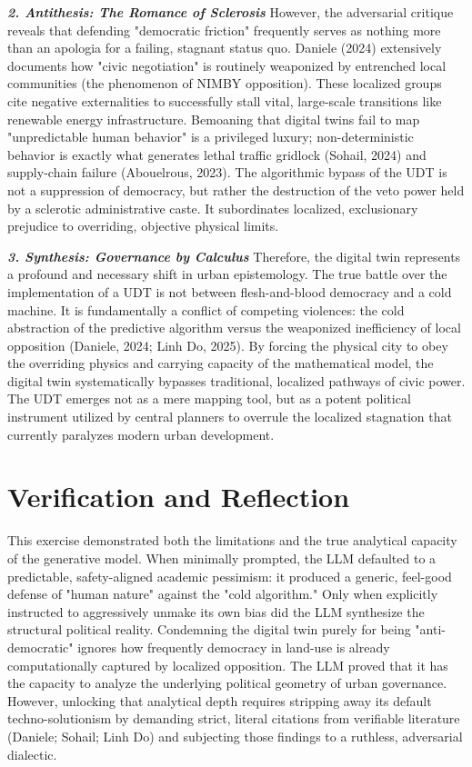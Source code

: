 \documentclass[11pt, twocolumn]{article}
\begin{document}
\textbf{\textit{2. Antithesis: The Romance of Sclerosis}}
However, the adversarial critique reveals that defending "democratic friction" frequently serves as nothing more than an apologia for a failing, stagnant status quo. Daniele (2024) extensively documents how "civic negotiation" is routinely weaponized by entrenched local communities (the phenomenon of NIMBY opposition). These localized groups cite negative externalities to successfully stall vital, large-scale transitions like renewable energy infrastructure. Bemoaning that digital twins fail to map "unpredictable human behavior" is a privileged luxury; non-deterministic behavior is exactly what generates lethal traffic gridlock (Sohail, 2024) and supply-chain failure (Abouelrous, 2023). The algorithmic bypass of the UDT is not a suppression of democracy, but rather the destruction of the veto power held by a sclerotic administrative caste. It subordinates localized, exclusionary prejudice to overriding, objective physical limits.

\textbf{\textit{3. Synthesis: Governance by Calculus}}
Therefore, the digital twin represents a profound and necessary shift in urban epistemology. The true battle over the implementation of a UDT is not between flesh-and-blood democracy and a cold machine. It is fundamentally a conflict of competing violences: the cold abstraction of the predictive algorithm versus the weaponized inefficiency of local opposition (Daniele, 2024; Linh Do, 2025). By forcing the physical city to obey the overriding physics and carrying capacity of the mathematical model, the digital twin systematically bypasses traditional, localized pathways of civic power. The UDT emerges not as a mere mapping tool, but as a potent political instrument utilized by central planners to overrule the localized stagnation that currently paralyzes modern urban development.

\section*{Verification and Reflection}
This exercise demonstrated both the limitations and the true analytical capacity of the generative model. When minimally prompted, the LLM defaulted to a predictable, safety-aligned academic pessimism: it produced a generic, feel-good defense of "human nature" against the "cold algorithm." Only when explicitly instructed to aggressively unmake its own bias did the LLM synthesize the structural political reality. Condemning the digital twin purely for being "anti-democratic" ignores how frequently democracy in land-use is already computationally captured by localized opposition. The LLM proved that it has the capacity to analyze the underlying political geometry of urban governance. However, unlocking that analytical depth requires stripping away its default techno-solutionism by demanding strict, literal citations from verifiable literature (Daniele; Sohail; Linh Do) and subjecting those findings to a ruthless, adversarial dialectic.
\end{document}
